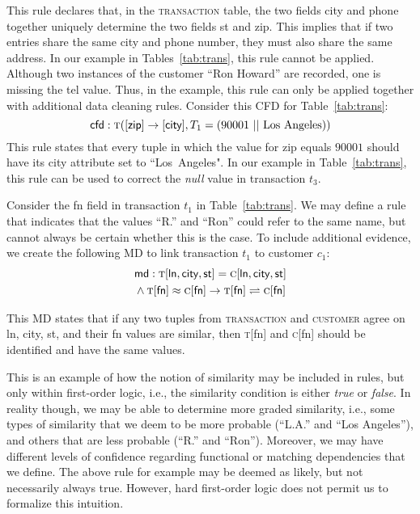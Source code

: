 This rule declares that, in the \textsc{transaction} table, 
the two fields \textsf{city} and \textsf{phone} together 
uniquely determine the two fields \textsf{st} and \textsf{zip}. 
This implies that if 
two entries share the same city and phone number, they must also share the same address. In our example in Tables~\ref{tab:trans}, 
this rule cannot be applied. Although two instances of the customer ``Ron Howard''
are recorded, one is missing the \textsf{tel} value. Thus, in the example, this rule can only be applied 
together with additional data cleaning rules. Consider this CFD for Table~\ref{tab:trans}: 
\begin{equation*}
\textsf{cfd}: \textsc{t}([\textsf{zip}] \rightarrow [\textsf{city}],
T_1 =(90001~||~\text{Los~Angeles}))  
\end{equation*}
This rule states that every tuple in which the value for
\textsf{zip} equals $90001$ should have its \textsf{city} attribute set to ``Los~Angeles".
In our example in Table~\ref{tab:trans}, this rule can be used to correct the \emph{null} 
value in transaction $t_3$. 

Consider the \textsf{fn} field in transaction $t_1$ in Table~\ref{tab:trans}. 
We may define a rule that indicates that the values ``R.'' and ``Ron'' could refer to the same name, but cannot always be certain whether
this is the case. To include additional evidence, we create the following MD to link transaction $t_1$ 
to customer $c_1$: 
\begin{align*} 
 &\textsf{md}: \textsc{t}[\textsf{ln}, \textsf{city}, \textsf{st}] 
 = \textsc{c}[\textsf{ln}, \textsf{city}, \textsf{st}] \\
 &\land \textsc{t}[\textsf{fn}] \approx \textsc{c}[\textsf{fn}] 
 \rightarrow \textsc{t}[\textsf{fn}] \rightleftharpoons \textsc{c}[\textsf{fn}]
\end{align*}
\vspace*{-0.5cm}

This MD states that if any two tuples from \textsc{transaction} and \textsc{customer}
agree on \textsf{ln}, \textsf{city}, \textsf{st},
and their \textsf{fn} values are similar, then \textsc{t}[\textsf{fn}] and 
\textsc{c}[\textsf{fn}]
should be identified and have the same values.

This is an example of how the notion of similarity may be included in rules, but only within first-order logic, i.e., the similarity
condition is either \emph{true} or \emph{false}. In reality though, we may be able
to determine more graded similarity, i.e., some types of similarity that we deem to be more probable (``L.A.'' and ``Los Angeles''), 
and others that are less probable (``R.'' and ``Ron''). Moreover, we may have different levels
of confidence regarding functional or matching dependencies that we define. 
The above rule for example may be deemed as likely, 
but not necessarily always true. However, hard first-order logic does not permit us to formalize this intuition.

